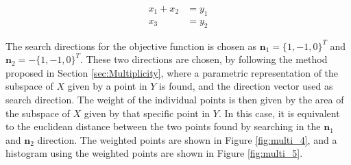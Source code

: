 \begin{equation}\label{eq:multi_constraint}
\begin{split}
x_1 + x_2 &= y_1 \\
x_3 &= y_2
\end{split}
\end{equation}

The search directions for the objective function is chosen as $\mathbf{n}_1 = \{1,-1,0\}^T$ and  $\mathbf{n}_2 = -\{1,-1,0\}^T$. These two directions are chosen, by following the method proposed in Section \ref{sec:Multiplicity}, where a parametric representation of the subspace of $X$ given by a point in $Y$ is found, and the direction vector used as search direction. The weight of the individual points is then given by the area of the subspace of $X$ given by that specific point in $Y$. In this case, it is equivalent to the euclidean distance between the two points found by searching in the $\mathbf{n}_1$ and $\mathbf{n}_2$ direction. The weighted points are shown in Figure \ref{fig:multi_4}, and a histogram using the weighted points are shown in Figure \ref{fig:multi_5}. 

